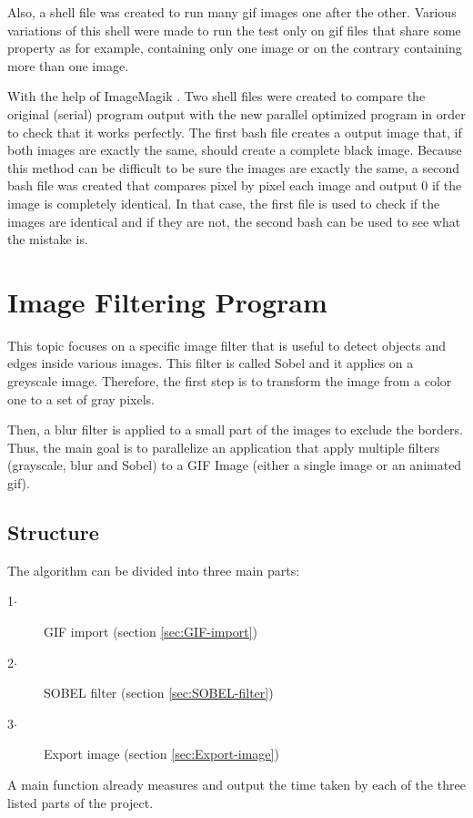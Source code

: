 \documentclass[conference,compsoc]{IEEEtran}
\begin{document}
Also, a shell file was created to run many gif images one after the other. Various variations of this shell were made to run the test only on gif files that share some property as for example, containing only one image or on the contrary containing more than one image.

With the help of ImageMagik \cite{IMAGEMAGICK}. Two shell files were created to compare the original (serial) program output with the new parallel optimized program in order to check that it works perfectly. The first bash file creates a output image that, if both images are exactly the same, should create a complete black image. Because this method can be difficult to be sure the images are exactly the same, a second bash file was created that compares pixel by pixel each image and output 0 if the image is completely identical. In that case, the first file is used to check if the images are identical and if they are not, the second bash can be used to see what the mistake is.

\section{Image Filtering Program}
This topic focuses on a specific image filter that is useful to detect objects and edges inside various images. This filter is called Sobel and it applies on a greyscale image. Therefore, the first step is to transform the image from a color one to a set of gray pixels. 

Then, a blur filter is applied to a small part of the images to exclude the borders. Thus, the main goal is to parallelize an application that apply multiple filters (grayscale, blur and Sobel) to a GIF Image (either a single image or an animated gif). \cite{CoursePage}
\subsection{Structure}
The algorithm can be divided into three main parts:
\begin{description}
	\item[1$\cdot$] GIF import (section \ref{sec:GIF-import})
	\item[2$\cdot$] SOBEL filter (section \ref{sec:SOBEL-filter})
	\item[3$\cdot$] Export image (section \ref{sec:Export-image})
\end{description}
A main function already measures and output the time taken by each of the three listed parts of the project.
\end{document}
